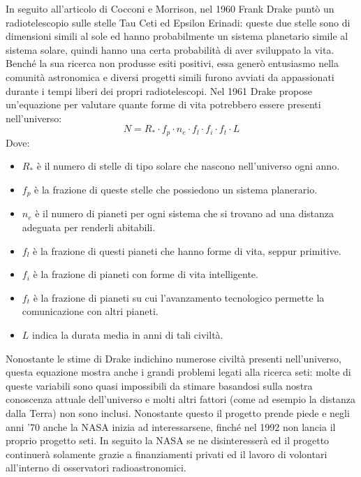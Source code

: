 In seguito all'articolo di Cocconi e Morrison, nel 1960 Frank Drake punt\`o un
radiotelescopio sulle stelle Tau Ceti ed Epsilon Erinadi: queste due stelle sono
di dimensioni simili al sole ed hanno probabilmente un sistema planetario simile
al sistema solare, quindi hanno una certa probabilit\`a di aver sviluppato la
vita. Bench\'e la sua ricerca non produsse esiti positivi, essa gener\`o
entusiasmo nella comunit\`a astronomica e diversi progetti simili furono avviati
da appassionati durante i tempi liberi dei propri radiotelescopi.
Nel 1961 Drake propose un'equazione per valutare quante forme di vita potrebbero
essere presenti nell'universo:
\[
N = R_* \cdot f_p \cdot n_e \cdot f_l \cdot f_i \cdot f_t \cdot L
\]
Dove:
\begin{itemize}
    \item $R_*$ \`e il numero di stelle di tipo solare che nascono nell'universo
    ogni anno.
    \item $f_p$ \`e la frazione di queste stelle che possiedono un sistema
    planerario.
    \item $n_e$ \`e il numero di pianeti per ogni sistema che si trovano ad una
    distanza adeguata per renderli abitabili.
    \item $f_l$ \`e la frazione di questi pianeti che hanno forme di vita,
    seppur primitive.
    \item $f_i$ \`e la frazione di pianeti con forme di vita intelligente.
    \item $f_t$ \`e la frazione di pianeti su cui l'avanzamento tecnologico
    permette la comunicazione con altri pianeti.
    \item $L$ indica la durata media in anni di tali civilt\`a.
\end{itemize}

Nonostante le stime di Drake indichino numerose civilt\`a presenti
nell'universo, questa equazione mostra anche i grandi problemi legati alla
ricerca \ac{seti}: molte di queste variabili sono quasi impossibili da stimare
basandosi sulla nostra conoscenza attuale dell'universo e molti altri fattori
(come ad esempio la distanza dalla Terra) non sono inclusi. Nonostante questo il
progetto prende piede e negli anni '70 anche la NASA inizia ad interessarsene,
finch\'e nel 1992 non lancia il proprio progetto \ac{seti}. In seguito la NASA
se ne disinteresser\`a ed il progetto continuer\`a solamente grazie a
finanziamenti privati ed il lavoro di volontari all'interno di osservatori
radioastronomici.

